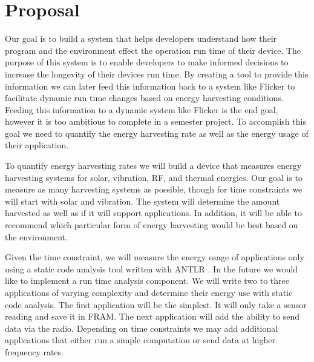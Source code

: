 \section{Proposal} %
\label{sec:proposal}

Our goal is to build a system that helps developers understand how their program and the environment effect the operation run time of their device.
The purpose of this system is to enable developers to make informed decisions to increase the longevity of their devices run time.
By creating a tool to provide this information we can later feed this information back to a system like Flicker \cite{flicker} to facilitate dynamic run time changes based on energy harvesting conditions.
Feeding this information to a dynamic system like Flicker is the end goal, however it is too ambitious to complete in a semester project.
To accomplish this goal we need to quantify the energy harvesting rate as well as the energy usage of their application.

To quantify energy harvesting rates we will build a device that measures energy harvesting systems for solar, vibration, RF, and thermal energies.
Our goal is to measure as many harvesting systems as possible, though for time constraints we will start with solar and vibration.
The system will determine the amount harvested as well as if it will support applications.
In addition, it will be able to recommend which particular form of energy harvesting would be best based on the environment.

Given the time constraint, we will measure the energy usage of applications only using a static code analysis tool written with ANTLR \cite{antlr}.
In the future we would like to implement a run time analysis component.
We will write two to three applications of varying complexity and determine their energy use with static code analysis.
The first application will be the simplest.
It will only take a sensor reading and save it in FRAM.
The next application will add the ability to send data via the radio.
Depending on time constraints we may add additional applications that either run a simple computation or send data at higher frequency rates.

